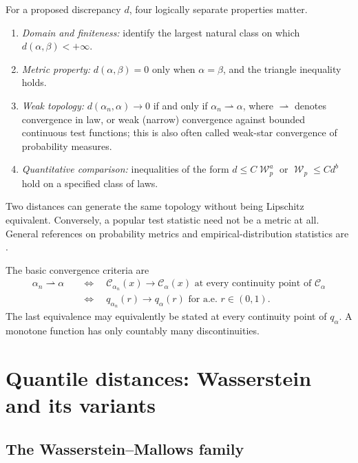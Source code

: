 \documentclass[11pt]{article}
\newcommand{\al}{\alpha}
\newcommand{\be}{\beta}
\newcommand{\Cc}{\mathcal C}
\newcommand{\cumul}[1]{\Cc_{#1}}
\DeclareMathOperator{\Wass}{\mathcal W}
\begin{document}
For a proposed discrepancy $d$, four logically separate properties matter.
\begin{enumerate}[label=\textnormal{(\roman*)},leftmargin=2.2em]
\item \emph{Domain and finiteness:} identify the largest natural class on
      which $d(\al,\be)<+\infty$.
\item \emph{Metric property:} $d(\al,\be)=0$ only when
      $\al=\be$, and the triangle inequality holds.
\item \emph{Weak topology:} $d(\al_n,\al)\to0$ if and only if
      $\al_n\rightharpoonup\al$, where $\rightharpoonup$ denotes convergence in
      law, or weak (narrow) convergence against bounded continuous test
      functions; this is also often called weak-star convergence of
      probability measures.
\item \emph{Quantitative comparison:} inequalities of the form
      $d\leq C\Wass_p^a$ or $\Wass_p\leq C d^b$ hold on a specified class of laws.
\end{enumerate}
Two distances can generate the same topology without being Lipschitz
equivalent.  Conversely, a popular test statistic need not be a metric at all.
General references on probability metrics and empirical-distribution
statistics are \cite{GibbsSu2002,ShorackWellner1986,Billingsley1999}.

The basic convergence criteria are
\begin{equation}\label{eq:weak-cdf-quantile}
\begin{aligned}
 \al_n\rightharpoonup\al
 &\quad\Longleftrightarrow\quad
 \cumul{\al_n}(x)\to \cumul{\al}(x)
 \text{ at every continuity point of }\cumul{\al} \\
 &\quad\Longleftrightarrow\quad
 q_{\al_n}(r)\to q_\al(r)
 \text{ for a.e. }r\in(0,1).
\end{aligned}
\end{equation}
The last equivalence may equivalently be stated at every continuity point of
$q_\al$.  A monotone function has only countably many discontinuities.

\section{Quantile distances: Wasserstein and its variants}

\subsection{The Wasserstein--Mallows family}
\end{document}
